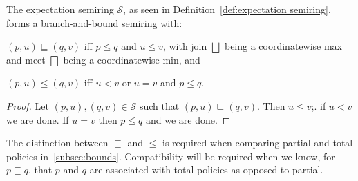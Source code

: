 \begin{proposition}\label{prop:S is bb semiring}
  The expectation semiring $\mathcal S$,
  as seen in Definition~\ref{def:expectation semiring},
  forms a branch-and-bound semiring with:
  \begin{enumerate*}
    \item $(p,u) \sqsubseteq (q,v)$ iff $p \leq q$ and $u \leq v$,
    with join $\bigsqcup$ being a coordinatewise max and
    meet $\bigsqcap$ being a coordinatewise min, and
    \item $(p,u) \leq (q,v)$ iff $u < v$ or $u=v$ and $p \leq q$.
  \end{enumerate*}
\end{proposition}

\begin{proof}
  Let $(p,u), (q,v) \in \mathcal S$ such that
  $(p,u) \sqsubseteq (q,v)$. Then $u \leq v$;. if $u <v$ we are done.
  If $u=v$ then $p \leq q$ and we are done.
\end{proof}

The distinction between $\sqsubseteq$ and $\leq$ is required when
comparing partial and total policies in~\cref{subsec:bounds}.
Compatibility will be required when we know, for $p \sqsubseteq q$,
that $p$ and $q$ are associated with total policies as opposed to partial.


